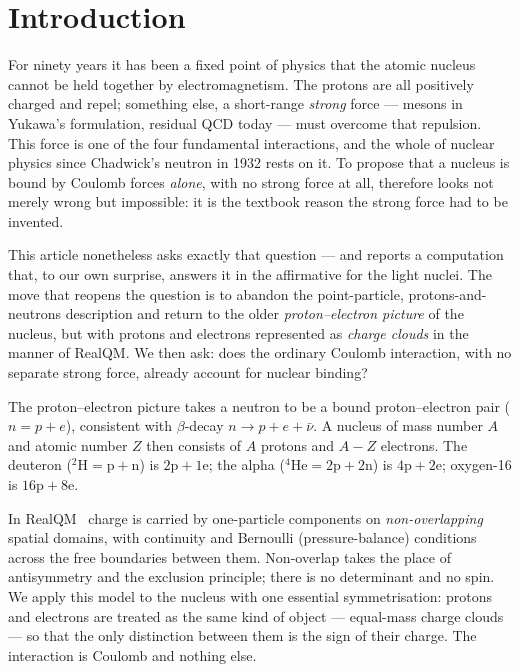 \documentclass[11pt]{article}
\begin{document}
\section{Introduction}

For ninety years it has been a fixed point of physics that the atomic nucleus cannot be held
together by electromagnetism. The protons are all positively charged and repel; something else,
a short-range \emph{strong} force --- mesons in Yukawa's formulation, residual QCD today --- must
overcome that repulsion. This force is one of the four fundamental interactions, and the whole of
nuclear physics since Chadwick's neutron in 1932 rests on it. To propose that a nucleus is bound
by Coulomb forces \emph{alone}, with no strong force at all, therefore looks not merely wrong but
impossible: it is the textbook reason the strong force had to be invented.

This article nonetheless asks exactly that question --- and reports a computation that, to our
own surprise, answers it in the affirmative for the light nuclei. The move that reopens the
question is to abandon the point-particle, protons-and-neutrons description and return to the
older \emph{proton--electron picture} of the nucleus, but with protons and electrons represented
as \emph{charge clouds} in the manner of RealQM. We then ask: does the ordinary Coulomb
interaction, with no separate strong force, already account for nuclear binding?

The proton--electron picture takes a neutron to be a bound proton--electron pair
($n = p + e$), consistent with $\beta$-decay $n\to p+e+\bar\nu$. A nucleus of mass number $A$
and atomic number $Z$ then consists of $A$ protons and $A-Z$ electrons. The deuteron
($^2\mathrm{H}=\mathrm{p}+\mathrm{n}$) is $\mathrm{2p}+\mathrm{1e}$; the alpha
($^4\mathrm{He}=\mathrm{2p}+\mathrm{2n}$) is $\mathrm{4p}+\mathrm{2e}$; oxygen-16 is
$\mathrm{16p}+\mathrm{8e}$.

In RealQM~\cite{Johnson-RealQM,Johnson-Atoms} charge is carried by one-particle components on
\emph{non-overlapping} spatial domains, with continuity and Bernoulli (pressure-balance)
conditions across the free boundaries between them. Non-overlap takes the place of
antisymmetry and the exclusion principle; there is no determinant and no spin. We apply this
model to the nucleus with one essential symmetrisation: protons and electrons are treated as
the same kind of object --- equal-mass charge clouds --- so that the only distinction between
them is the sign of their charge. The interaction is Coulomb and nothing else.
\end{document}
